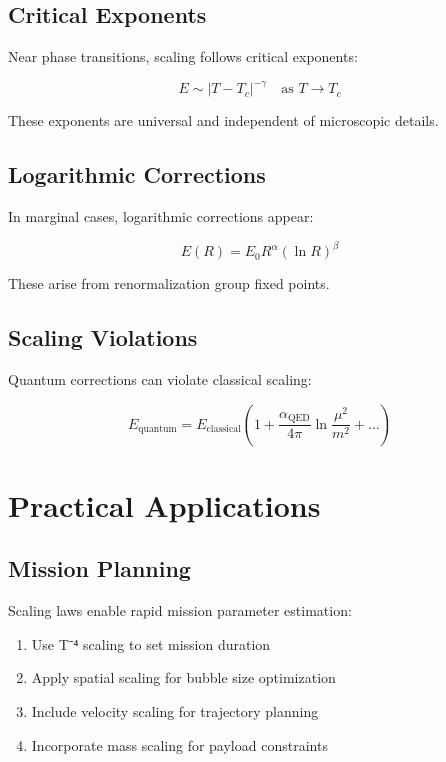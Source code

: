 \documentclass[12pt,a4paper]{article}
\begin{document}
\subsection{Critical Exponents}

Near phase transitions, scaling follows critical exponents:

\begin{equation}
E \sim |T - T_c|^{-\gamma} \quad \text{as } T \rightarrow T_c
\end{equation}

These exponents are universal and independent of microscopic details.

\subsection{Logarithmic Corrections}

In marginal cases, logarithmic corrections appear:

\begin{equation}
E(R) = E_0 R^\alpha (\ln R)^\beta
\end{equation}

These arise from renormalization group fixed points.

\subsection{Scaling Violations}

Quantum corrections can violate classical scaling:

\begin{equation}
E_{\text{quantum}} = E_{\text{classical}} \left(1 + \frac{\alpha_{\text{QED}}}{4\pi} \ln\frac{\mu^2}{m^2} + \ldots\right)
\end{equation}

\section{Practical Applications}

\subsection{Mission Planning}

Scaling laws enable rapid mission parameter estimation:

\begin{enumerate}
\item Use T⁻⁴ scaling to set mission duration
\item Apply spatial scaling for bubble size optimization
\item Include velocity scaling for trajectory planning
\item Incorporate mass scaling for payload constraints
\end{enumerate}
\end{document}
